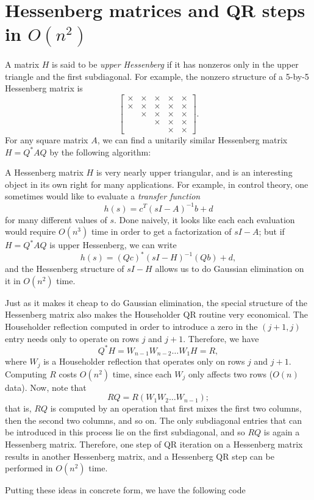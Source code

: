 \section{Hessenberg matrices and QR steps in $O(n^2)$}

A matrix $H$ is said to be {\em upper Hessenberg} if it has
nonzeros only in the upper triangle and the first subdiagonal.
For example, the nonzero structure of a 5-by-5 Hessenberg matrix
is
\[
  \begin{bmatrix}
    \times & \times & \times & \times & \times \\
    \times & \times & \times & \times & \times \\
           & \times & \times & \times & \times \\
           &        & \times & \times & \times \\
           &        &        & \times & \times
  \end{bmatrix}.
\]
For any square matrix $A$, we can find a unitarily similar Hessenberg
matrix $H = Q^* A Q$ by the following algorithm:


A Hessenberg matrix $H$ is very nearly upper triangular, and is an
interesting object in its own right for many applications.  For
example, in control theory, one sometimes would like to evaluate a
{\em transfer function}
\[
  h(s) = c^T (sI-A)^{-1} b + d
\]
for many different values of $s$.  Done naively, it looks like each
each evaluation would require $O(n^3)$ time in order to get a
factorization of $sI-A$; but if $H = Q^* A Q$ is upper Hessenberg, we
can write
\[
  h(s) = (Qc)^* (sI-H)^{-1} (Qb) + d,
\]
and the Hessenberg structure of $sI-H$ allows us to do Gaussian
elimination on it in $O(n^2)$ time.

Just as it makes it cheap to do Gaussian elimination, the special
structure of the Hessenberg matrix also makes the Householder QR
routine very economical.  The Householder reflection computed in order
to introduce a zero in the $(j+1,j)$ entry needs only to operate on
rows $j$ and $j+1$.  Therefore, we have
\[
  Q^* H = W_{n-1} W_{n-2} \ldots W_1 H = R,
\]
where $W_{j}$ is a Householder reflection that operates only on rows
$j$ and $j+1$.  Computing $R$ costs $O(n^2)$ time, since each $W_j$
only affects two rows ($O(n)$ data).  Now, note that
\[
  R Q = R (W_1 W_2 \ldots W_{n-1});
\]
that is, $RQ$ is computed by an operation that first mixes the first
two columns, then the second two columns, and so on.  The only subdiagonal
entries that can be introduced in this process lie on the first subdiagonal,
and so $RQ$ is again a Hessenberg matrix.  Therefore, one step of QR iteration
on a Hessenberg matrix results in another Hessenberg matrix, and a Hessenberg
QR step can be performed in $O(n^2)$ time.

Putting these ideas in concrete form, we have the following code

